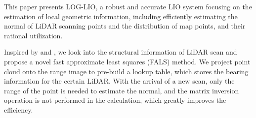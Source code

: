 \documentclass[letterpaper, 10 pt, conference]{ieeeconf}  %
\newcommand{\COMMENT}[1]{\textcolor{red}{ (#1) }}
\begin{document}
This paper presents LOG-LIO, a robust and accurate LIO system focusing on the estimation of local geometric information, including efficiently estimating the normal of LiDAR scanning points and the distribution of map points, and their rational utilization.

Inspired by \cite{badino2011fast} and \cite{fan2021three}, we look into the structural information of LiDAR scan and propose a novel fast approximate least squares (FALS) method.
We project point cloud onto the range image to pre-build a lookup table, which stores the bearing information for the certain LiDAR.
With the arrival of a new scan, only the range of the point is needed to estimate the normal, and the matrix inversion operation is not performed in the calculation, which greatly improves the efficiency.
\end{document}
